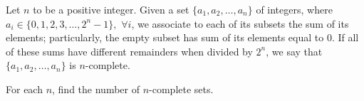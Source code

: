 Let $n$ to be a positive integer. Given a set $\{ a_1, a_2, \ldots, a_n \} $ of integers, where $a_i \in \{ 0, 1, 2, 3, \ldots, 2^n -1 \},$ $\forall i$,  we associate to each of its subsets the sum of its elements; particularly, the empty subset has sum of its elements equal to $0$. If all of these sums have different remainders when divided by $2^n$,  we say that $\{ a_1, a_2, \ldots, a_n \} $ is $n$-complete.

For each $n$,  find the number of $n$-complete sets.